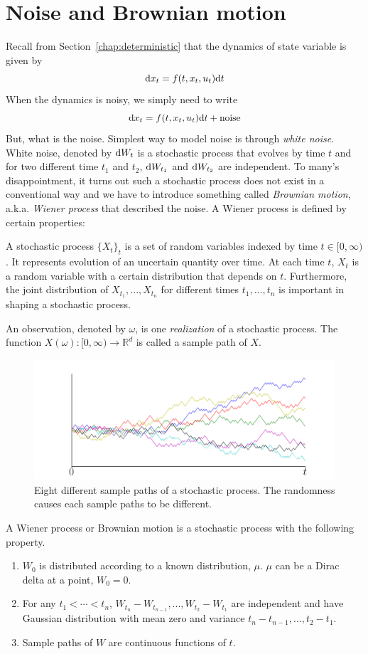 \documentclass[11pt]{book}
\newcommand{\dt}{\text{\normalfont d}t}
\newcommand{\dx}{\text{\normalfont d}x}
\newcommand{\dW}{\text{\normalfont d}W}
\begin{document}
\section{Noise and Brownian motion}
Recall from Section~\ref{chap:deterministic} that the dynamics of state variable is given by
\[
\dx_t=f(t,x_t,u_t)\dt
\]
When the dynamics is noisy, we simply need to write
\[
\dx_t=f(t,x_t,u_t)\dt+\text{noise}
\]
But, what is the noise. Simplest way to model noise is through \emph{white noise}. White noise, denoted by $\dW_t$ is a stochastic process that evolves by time $t$ and for two different time $t_1$ and $t_2$, $\dW_{t_1}$ and $\dW_{t_2}$ are independent. To many's disappointment, it turns out such a stochastic process does not exist in a conventional way and we have to introduce something called \emph{Brownian motion}, a.k.a. \emph{Wiener process} that described the noise.
A Wiener process is defined by certain properties:
\begin{defn}
A stochastic process $\{X_t\}_{t}$ is a set of random variables indexed by time $t\in[0,\infty)$. It represents evolution of an uncertain quantity over time. At each time $t$, $X_t$ is a random variable with a certain distribution that depends on $t$. Furthermore, the joint distribution of $X_{t_1},...,X_{t_n}$ for different times $t_1,...,t_n$ is important in shaping a stochastic process.

An observation, denoted by $\omega$, is one \emph{realization} of a stochastic process. The function $X(\omega):[0,\infty)\to\mathbb{R}^d$ is called a sample path of $X$.
\end{defn}
\begin{figure}[H]
    \centering
    \includegraphics[width=0.95\linewidth]{Control_lecture_notes/Figs/bm_1d_100.png}
    \caption{Eight different sample paths of a stochastic process. The randomness causes each sample paths to be different.}
    \label{fig:random_var}
\end{figure}
\begin{defn}
    A Wiener process or Brownian motion is a stochastic process with the following property.
    \begin{enumerate}[label = \bfseries \arabic*)]
        \item $W_0$ is distributed according to a known distribution, $\mu$. $\mu$ can be a Dirac delta at a point, $W_0=0$.
        \item For any $t_{1}<\cdots<t_{n}$, $W_{t_{n}}-W_{t_{n-1}},...,W_{t_{2}}-W_{t_{1}}$ are independent and have Gaussian distribution with mean zero and variance $t_{n}-t_{n-1},...,t_{2}-t_{1}$.
        \item Sample paths of $W$ are continuous functions of $t$.
    \end{enumerate}
\end{defn}
\end{document}
